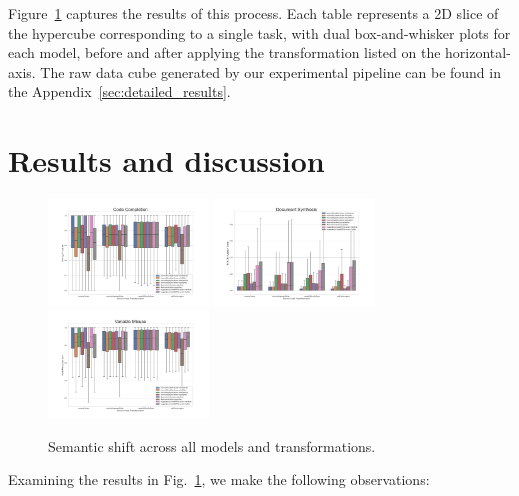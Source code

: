 \documentclass[usenames,dvipsnames]{article} %
\begin{document}
  Figure~\ref{fig:semantic_drift} captures the results of this process. Each table represents a 2D slice of the hypercube corresponding to a single task, with dual box-and-whisker plots for each model, before and after applying the transformation listed on the horizontal-axis. The raw data cube generated by our experimental pipeline can be found in the Appendix~\ref{sec:detailed_results}.

  \section{Results and discussion}\label{sec:results}

  \vspace{-10pt}\begin{figure}[H]
                  \centering\hspace*{-0.6cm}
                  \includegraphics[width=0.38\textwidth]{figs/Code Completion}\hspace*{-0.6cm}
                  \includegraphics[width=0.38\textwidth]{figs/Document Synthesis}\hspace*{-0.6cm}
                  \includegraphics[width=0.38\textwidth]{figs/Variable Misuse}
                  \caption{Semantic shift across all models and transformations.}
                  \label{fig:semantic_drift}
  \end{figure}

  Examining the results in Fig.~\ref{fig:semantic_drift}, we make the following observations:
\end{document}
